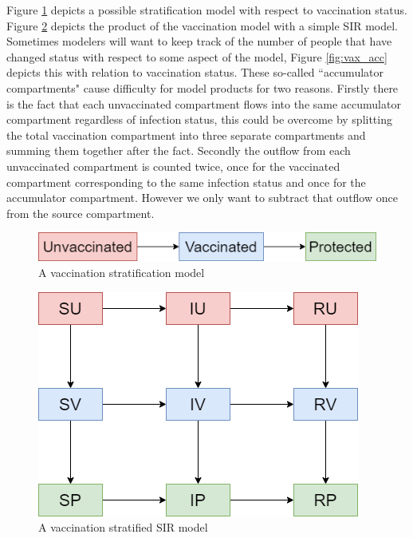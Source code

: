 \begin{appendices}
Figure \ref{fig:vax_strat} depicts a possible stratification model with respect to vaccination status. Figure \ref{fig:vax_prod} depicts the product of the vaccination model with a simple SIR model. Sometimes modelers will want to keep track of the number of people that have changed status with respect to some aspect of the model, Figure \ref{fig:vax_acc} depicts this with relation to vaccination status. These so-called “accumulator compartments" cause difficulty for model products for two reasons. Firstly there is the fact that each unvaccinated compartment flows into the same accumulator compartment regardless of infection status, this could be overcome by splitting the total vaccination compartment into three separate compartments and summing them together after the fact. Secondly the outflow from each unvaccinated compartment is counted twice, once for the vaccinated compartment corresponding to the same infection status and once for the accumulator compartment. However we only want to subtract that outflow once from the source compartment.

\begin{figure}
    \centering
    \includegraphics[width=\textwidth]{images/vax_strat.png}
    \caption{A vaccination stratification model}
    \label{fig:vax_strat}
\end{figure}

\begin{figure}
    \centering
    \includegraphics[width=\textwidth]{images/vax_prod.png}
    \caption{A vaccination stratified SIR model}
    \label{fig:vax_prod}
\end{figure}


\end{appendices}
